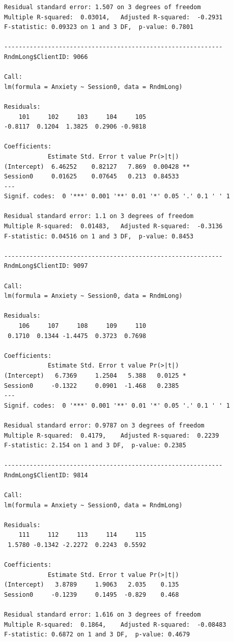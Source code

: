 \documentclass[
  english,
]{book}
\begin{document}
\begin{verbatim}
Residual standard error: 1.507 on 3 degrees of freedom
Multiple R-squared:  0.03014,   Adjusted R-squared:  -0.2931 
F-statistic: 0.09323 on 1 and 3 DF,  p-value: 0.7801

------------------------------------------------------------ 
RndmLong$ClientID: 9066

Call:
lm(formula = Anxiety ~ Session0, data = RndmLong)

Residuals:
    101     102     103     104     105 
-0.8117  0.1204  1.3825  0.2906 -0.9818 

Coefficients:
            Estimate Std. Error t value Pr(>|t|)   
(Intercept)  6.46252    0.82127   7.869  0.00428 **
Session0     0.01625    0.07645   0.213  0.84533   
---
Signif. codes:  0 '***' 0.001 '**' 0.01 '*' 0.05 '.' 0.1 ' ' 1

Residual standard error: 1.1 on 3 degrees of freedom
Multiple R-squared:  0.01483,   Adjusted R-squared:  -0.3136 
F-statistic: 0.04516 on 1 and 3 DF,  p-value: 0.8453

------------------------------------------------------------ 
RndmLong$ClientID: 9097

Call:
lm(formula = Anxiety ~ Session0, data = RndmLong)

Residuals:
    106     107     108     109     110 
 0.1710  0.1344 -1.4475  0.3723  0.7698 

Coefficients:
            Estimate Std. Error t value Pr(>|t|)  
(Intercept)   6.7369     1.2504   5.388   0.0125 *
Session0     -0.1322     0.0901  -1.468   0.2385  
---
Signif. codes:  0 '***' 0.001 '**' 0.01 '*' 0.05 '.' 0.1 ' ' 1

Residual standard error: 0.9787 on 3 degrees of freedom
Multiple R-squared:  0.4179,    Adjusted R-squared:  0.2239 
F-statistic: 2.154 on 1 and 3 DF,  p-value: 0.2385

------------------------------------------------------------ 
RndmLong$ClientID: 9814

Call:
lm(formula = Anxiety ~ Session0, data = RndmLong)

Residuals:
    111     112     113     114     115 
 1.5780 -0.1342 -2.2272  0.2243  0.5592 

Coefficients:
            Estimate Std. Error t value Pr(>|t|)
(Intercept)   3.8789     1.9063   2.035    0.135
Session0     -0.1239     0.1495  -0.829    0.468

Residual standard error: 1.616 on 3 degrees of freedom
Multiple R-squared:  0.1864,    Adjusted R-squared:  -0.08483 
F-statistic: 0.6872 on 1 and 3 DF,  p-value: 0.4679


\end{verbatim}
\end{document}
